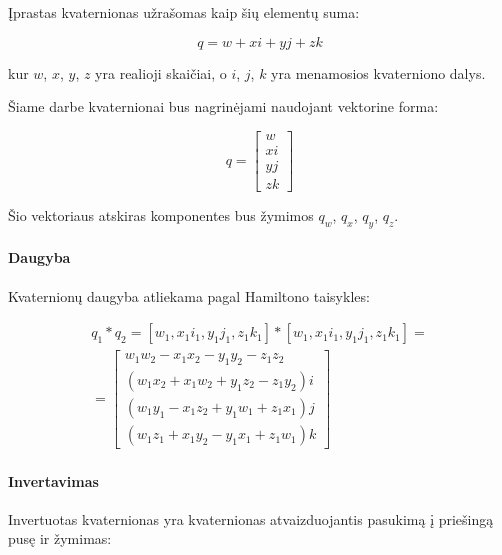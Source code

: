 \documentclass[12pt, a4paper, lithuanian, final]{article}
\begin{document}
Įprastas kvaternionas užrašomas kaip šių elementų suma:

\begin{equation}
	q = w + xi + yj + zk
\end{equation}

kur $w$, $x$, $y$, $z$ yra realioji skaičiai, o $i$, $j$, $k$ yra menamosios kvaterniono dalys.

Šiame darbe kvaternionai bus nagrinėjami naudojant vektorine forma:

\begin{equation}
	q = \left[
		\begin{array}{c}
			w \\
			xi \\
			yj \\
			zk
		\end{array}
	\right]
\end{equation}

Šio vektoriaus atskiras komponentes bus žymimos $q_w$, $q_x$, $q_y$, $q_z$.


\paragraph{Daugyba}

Kvaternionų daugyba atliekama pagal Hamiltono taisykles:

\begin{equation}
	\begin{array}{c}
		q_1 * q_2 = \left[ w_1, x_1 i_1, y_1j_1, z_1k_1 \right] * \left[ w_1, x_1 i_1, y_1j_1, z_1k_1 \right] = \\
		= \left[
			\begin{array}{c}
				w_1 w_2 - x_1 x_2 - y_1 y_2 - z_1 z_2 \\
				(w_1 x_2 + x_1 w_2 + y_1 z_2 - z_1 y_2) i \\
				(w_1 y_1 - x_1 z_2 + y_1 w_1 + z_1 x_1) j \\
				(w_1 z_1 + x_1 y_2 - y_1 x_1 + z_1 w_1) k
			\end{array}
		\right]
	\end{array}
\end{equation}

\paragraph{Invertavimas}

Invertuotas kvaternionas yra kvaternionas atvaizduojantis pasukimą į priešingą pusę ir žymimas:
\end{document}
